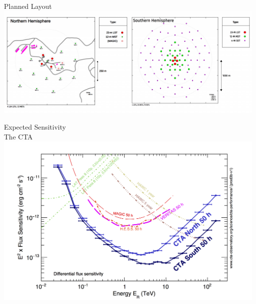 \begin{frame}{Planned Layout \\ \footnotesize{\cite{cta_sensitivity}}}
\centering
        \includegraphics[width=\linewidth]{images/cta_layout_2.png}
\end{frame}


\begin{frame}{Expected Sensitivity \\ \footnotesize{The CTA \cite{cta_sensitivity}}}
\centering
        \includegraphics[width=0.7\linewidth]{images/cta_sensitivity.png}
\end{frame}

